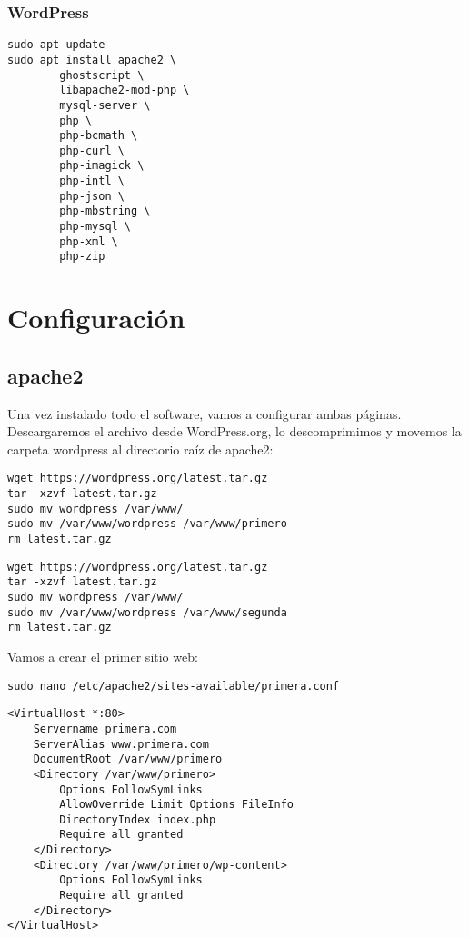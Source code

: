 \documentclass{article}
\begin{document}
\subsubsection{WordPress}

\begin{lstlisting}[frame=single]
sudo apt update
sudo apt install apache2 \
		ghostscript \
		libapache2-mod-php \
		mysql-server \
		php \
		php-bcmath \
		php-curl \
		php-imagick \
		php-intl \
		php-json \
		php-mbstring \
		php-mysql \
		php-xml \
		php-zip

\end{lstlisting}




\section{Configuración}
\subsection{apache2}
\begin{flushleft}
Una vez instalado todo el software, vamos a configurar ambas páginas.\\
Descargaremos el archivo desde WordPress.org, lo
descomprimimos y movemos la carpeta wordpress al directorio
raíz de apache2:
\end{flushleft}

\begin{lstlisting}[frame=single]
wget https://wordpress.org/latest.tar.gz
tar -xzvf latest.tar.gz
sudo mv wordpress /var/www/
sudo mv /var/www/wordpress /var/www/primero
rm latest.tar.gz
\end{lstlisting}

\begin{lstlisting}[frame=single]
wget https://wordpress.org/latest.tar.gz
tar -xzvf latest.tar.gz
sudo mv wordpress /var/www/
sudo mv /var/www/wordpress /var/www/segunda
rm latest.tar.gz
\end{lstlisting}


\begin{flushleft}
Vamos a crear el primer sitio web: 
\end{flushleft}

\begin{lstlisting}[frame=single]
sudo nano /etc/apache2/sites-available/primera.conf
\end{lstlisting}


\begin{lstlisting}[frame=single]
<VirtualHost *:80>
	Servername primera.com
	ServerAlias www.primera.com
	DocumentRoot /var/www/primero
	<Directory /var/www/primero>
		Options FollowSymLinks
		AllowOverride Limit Options FileInfo
		DirectoryIndex index.php
		Require all granted
	</Directory>
	<Directory /var/www/primero/wp-content>
		Options FollowSymLinks
		Require all granted
	</Directory>
</VirtualHost>


\end{lstlisting}
\end{document}
